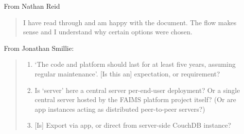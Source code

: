 \documentclass{faims3_report}
\begin{document}
From Nathan Reid
\begin{quote}
I have read through and am happy with the document. The flow makes sense
and I understand why certain options were chosen.
\end{quote}

From Jonathan Smillie:
\begin{quote}
 \begin{enumerate}[itemsep=1em]
\item `The code and platform should last for at least five years, assuming 
   regular maintenance'. {[}Is this an{]} expectation, or requirement?

\item Is `server' here a central server per-end-user deployment? Or a single 
   central server hosted by the FAIMS platform project itself? 
   (Or are app instances acting as distributed peer-to-peer servers?)

\item {[}Is{]} Export via app, or direct from server-side CouchDB instance?

\end{enumerate}
\end{quote}
\end{document}
